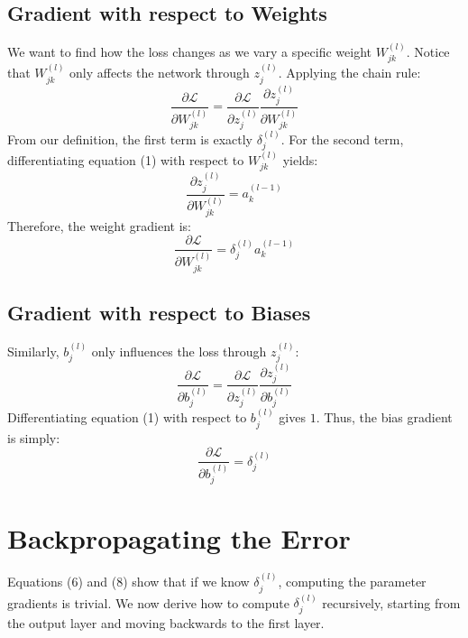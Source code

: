 \documentclass[11pt,a4paper]{article}
\begin{document}
\subsection{Gradient with respect to Weights}
We want to find how the loss changes as we vary a specific weight $W_{jk}^{(l)}$. Notice that $W_{jk}^{(l)}$ only affects the network through $z_j^{(l)}$. Applying the chain rule:
\begin{equation}
	\frac{\partial \mathcal{L}}{\partial W_{jk}^{(l)}} = \frac{\partial \mathcal{L}}{\partial z_j^{(l)}} \frac{\partial z_j^{(l)}}{\partial W_{jk}^{(l)}}
\end{equation}
From our definition, the first term is exactly $\delta_j^{(l)}$. For the second term, differentiating equation (1) with respect to $W_{jk}^{(l)}$ yields:
\begin{equation}
	\frac{\partial z_j^{(l)}}{\partial W_{jk}^{(l)}} = a_k^{(l-1)}
\end{equation}
Therefore, the weight gradient is:
\begin{equation}
	\frac{\partial \mathcal{L}}{\partial W_{jk}^{(l)}} = \delta_j^{(l)} a_k^{(l-1)}
\end{equation}

\subsection{Gradient with respect to Biases}
Similarly, $b_j^{(l)}$ only influences the loss through $z_j^{(l)}$:
\begin{equation}
	\frac{\partial \mathcal{L}}{\partial b_j^{(l)}} = \frac{\partial \mathcal{L}}{\partial z_j^{(l)}} \frac{\partial z_j^{(l)}}{\partial b_j^{(l)}}
\end{equation}
Differentiating equation (1) with respect to $b_j^{(l)}$ gives $1$. Thus, the bias gradient is simply:
\begin{equation}
	\frac{\partial \mathcal{L}}{\partial b_j^{(l)}} = \delta_j^{(l)}
\end{equation}

\section{Backpropagating the Error}

Equations (6) and (8) show that if we know $\delta_j^{(l)}$, computing the parameter gradients is trivial. We now derive how to compute $\delta_j^{(l)}$ recursively, starting from the output layer and moving backwards to the first layer.
\end{document}
